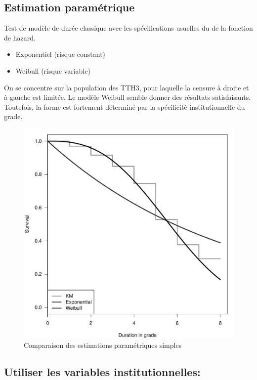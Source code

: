 \documentclass[11pt,a4paper]{article}
\begin{document}
\subsection*{Estimation paramétrique}

Test de modèle de durée classique avec les spécifications usuelles du de la fonction de hazard. 
\begin{itemize}[leftmargin=1cm ,parsep=0cm,itemsep=0cm,topsep=0cm] 
\item Exponentiel (risque constant)
\item Weibull (risque variable)
\end{itemize} 

On se concentre sur la population des TTH3, pour laquelle la censure à droite et à gauche est limitée. Le modèle Weibull semble donner des résultats satisfaisants. Toutefois, la forme est fortement déterminé par la spécificité institutionnelle du grade. 


\begin{figure}[H] 
  \caption{Comparaison des estimations paramétriques simples}
    \includegraphics[scale = 0.6]{comp.pdf} 
\end{figure}




\subsection*{Utiliser les variables institutionnelles:}
\end{document}
